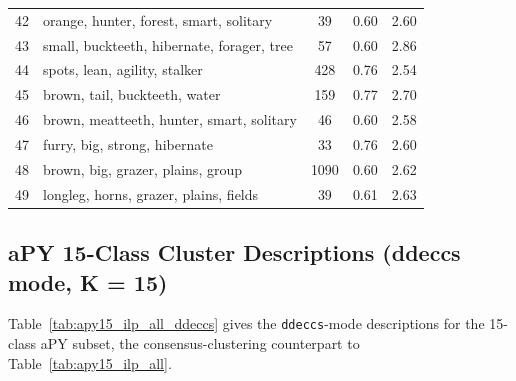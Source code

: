 \begin{table}[H]
\begin{tabular}{clccc}
        42 & orange, hunter, forest, smart, solitary & 39 & 0.60 & 2.60 \\
        43 & small, buckteeth, hibernate, forager, tree & 57 & 0.60 & 2.86 \\
        44 & spots, lean, agility, stalker & 428 & 0.76 & 2.54 \\
        45 & brown, tail, buckteeth, water & 159 & 0.77 & 2.70 \\
        46 & brown, meatteeth, hunter, smart, solitary & 46 & 0.60 & 2.58 \\
        47 & furry, big, strong, hibernate & 33 & 0.76 & 2.60 \\
        48 & brown, big, grazer, plains, group & 1090 & 0.60 & 2.62 \\
        49 & longleg, horns, grazer, plains, fields & 39 & 0.61 & 2.63 \\
        \bottomrule
    \end{tabular}
\end{table}

\subsection{aPY 15-Class Cluster Descriptions (ddeccs mode, K = 15)}

Table~\ref{tab:apy15_ilp_all_ddeccs} gives the \texttt{ddeccs}-mode descriptions for the 15-class aPY subset, the consensus-clustering counterpart to Table~\ref{tab:apy15_ilp_all}.


